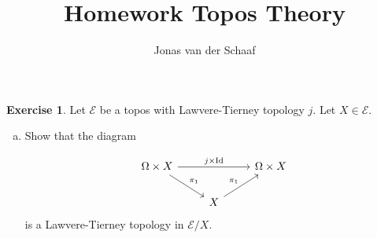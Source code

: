 \documentclass{article}
\title{Homework Topos Theory}
\author{Jonas van der Schaaf}
\date{}
\DeclareMathOperator{\Id}{Id}
\newcommand{\topos}{\mathcal{E}}
\theoremstyle{definition}
\newtheorem{question}{Exercise}
\begin{document}
\maketitle

\begin{question}
    Let \(\topos\) be a topos with Lawvere-Tierney topology \(j\). Let
    \(X\in\topos\).

    \begin{enumerate}[(a)]
        \item Show that the diagram

              \[
                  \begin{tikzcd}[ampersand replacement=\&]
                      \Omega\times X \&\&\Omega\times X\\
                      \& X
                      \arrow["j\times \Id", from=1-1, to=1-3]
                      \arrow["\pi_{1}", from=1-1, to=2-2]
                      \arrow["\pi_{1}", from=2-2, to=1-3]
                  \end{tikzcd}
              \]
              is a Lawvere-Tierney topology in \(\topos/X\).


\end{enumerate}
\end{question}
\end{document}
